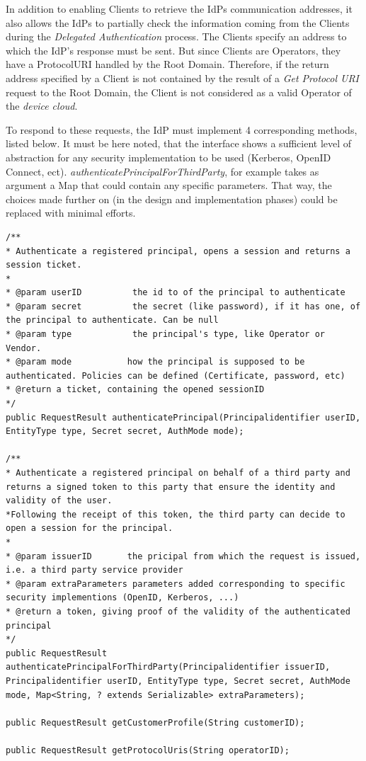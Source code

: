 In addition to enabling Clients to retrieve the IdPs communication addresses, it also allows the IdPs to partially check the information coming from the Clients during the \textit{Delegated Authentication} process. The Clients specify an address to which the IdP's response must be sent. But since Clients are Operators, they have a ProtocolURI handled by the Root Domain. Therefore, if the return address specified by a Client is not contained by the result of a \textit{Get Protocol URI} request to the Root Domain, the Client is not considered as a valid Operator of the \emph{device cloud}.

\vspace{2em}

To respond to these requests, the IdP must implement 4 corresponding methods, listed below. It must be here noted, that the interface shows a sufficient level of abstraction for any security implementation to be used (Kerberos, OpenID Connect, ect). \textit{authenticatePrincipalForThirdParty}, for example takes as argument a Map that could contain any specific parameters. That way, the choices made further on (in the design and implementation phases) could be replaced with minimal efforts. 

\label{interface_methods}

\lstset{language=Java}
\begin{lstlisting}
/**
* Authenticate a registered principal, opens a session and returns a session ticket.
*
* @param userID          the id to of the principal to authenticate
* @param secret          the secret (like password), if it has one, of the principal to authenticate. Can be null
* @param type            the principal's type, like Operator or Vendor.
* @param mode          	how the principal is supposed to be authenticated. Policies can be defined (Certificate, password, etc)
* @return a ticket, containing the opened sessionID
*/
public RequestResult authenticatePrincipal(Principalidentifier userID, EntityType type, Secret secret, AuthMode mode);

/**
* Authenticate a registered principal on behalf of a third party and returns a signed token to this party that ensure the identity and validity of the user.
*Following the receipt of this token, the third party can decide to open a session for the principal.
*
* @param issuerID       the pricipal from which the request is issued, i.e. a third party service provider
* @param extraParameters parameters added corresponding to specific security implementions (OpenID, Kerberos, ...)
* @return a token, giving proof of the validity of the authenticated principal
*/
public RequestResult authenticatePrincipalForThirdParty(Principalidentifier issuerID, Principalidentifier userID, EntityType type, Secret secret, AuthMode mode, Map<String, ? extends Serializable> extraParameters);

public RequestResult getCustomerProfile(String customerID);

public RequestResult getProtocolUris(String operatorID);
\end{lstlisting}

